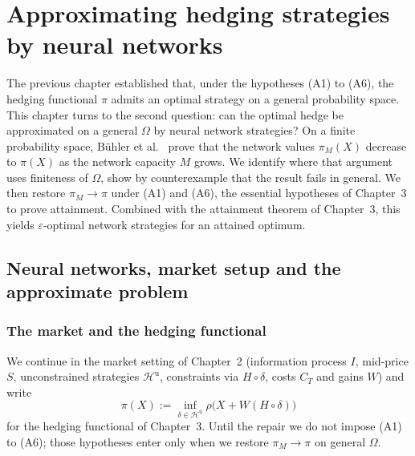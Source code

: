 \documentclass[11pt,a4paper]{report}
\numberwithin{equation}{chapter}
\theoremstyle{plain}
\theoremstyle{definition}
\newcommand{\Hu}{\mathcal{H}^{\mathrm{u}}}
\begin{document}
\setcounter{chapter}{3}

\chapter{Approximating hedging strategies by neural networks}
\label{ch:approximation}

The previous chapter established that, under the hypotheses (A1) to
(A6), the hedging functional $\pi$ admits an optimal strategy on a
general probability space. This chapter turns to the second question:
can the optimal hedge be approximated on a general $\Omega$ by neural
network strategies? On a finite probability space, B\"uhler et al.\
\cite[Proposition~4.3]{buehler} prove that the network values
$\pi_M(X)$ decrease to $\pi(X)$ as the network capacity $M$ grows.
We identify where that argument uses finiteness of $\Omega$, show by
counterexample that the result fails in general.
We then restore
$\pi_M\to\pi$ under (A1) and (A6), the essential hypotheses of Chapter~3 to prove attainment. Combined with the attainment
theorem of Chapter~3, this yields $\varepsilon$-optimal network
strategies for an attained optimum.

\section{Neural networks, market setup and the approximate problem}
\label{sec:setup}

\subsection*{The market and the hedging functional}

We continue in the market setting of Chapter~2 (information process
$I$, mid-price $S$, unconstrained strategies $\Hu$, constraints via
$H\circ\delta$, costs $C_T$ and gains $W$) and write
\begin{equation}\label{eq:pi}
  \pi(X):=\inf_{\delta\in\Hu}\rho\bigl(X+W(H\circ\delta)\bigr)
\end{equation}
for the hedging functional of Chapter~3. Until the repair we do not
impose (A1) to (A6); those hypotheses enter only when we restore
$\pi_M\to\pi$ on general $\Omega$.
\end{document}
